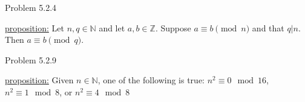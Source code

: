 \documentclass{article}
\theoremstyle{definition}
\newcommand{\Z}{\mathbb{Z}}
\newcommand{\N}{\mathbb{N}}
\begin{document}
	\vspace{1cm}



	\noindent Problem 5.2.4  \vspace{0.3cm}

	\underline{proposition:}  Let $n,q \in  \N$ and let $a,b\in\Z.$  Suppose $a\equiv b\pmod{n}$ and that $q|n.$  Then $a\equiv b\pmod{q}.$

	\vspace{.2cm}


	\vspace{1cm}




	\noindent Problem 5.2.9  \vspace{0.3cm}

	\underline{proposition:}  Given $n\in \N$, one of the following is
	true: $n^2\equiv 0 \mod 16$, $n^2\equiv 1 \mod 8$, or $n^2\equiv 4
	\mod 8$

	\vspace{.2cm}


	\vspace{1cm}


\end{document}
